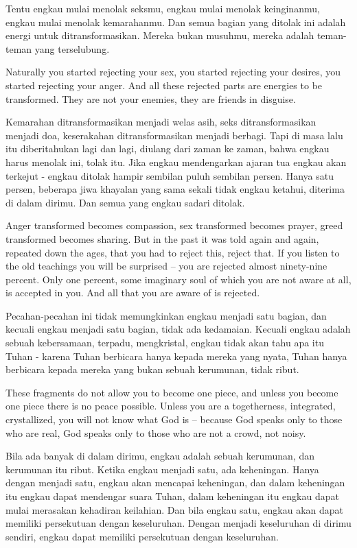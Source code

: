 \bahasa
Tentu engkau mulai menolak seksmu, engkau mulai menolak keinginanmu, engkau mulai menolak kemarahanmu. Dan semua bagian yang ditolak ini adalah energi untuk ditransformasikan. Mereka bukan musuhmu, mereka adalah teman-teman yang terselubung.

\english
Naturally you started rejecting your sex, you started rejecting your desires, you started rejecting your anger. And all these rejected parts are energies to be transformed. They are not your enemies, they are friends in disguise.

\bahasa
Kemarahan ditransformasikan menjadi welas asih, seks ditransformasikan menjadi doa, keserakahan ditransformasikan menjadi berbagi. Tapi di masa lalu itu diberitahukan lagi dan lagi, diulang dari zaman ke zaman, bahwa engkau harus menolak ini, tolak itu. Jika engkau mendengarkan ajaran tua engkau akan terkejut - engkau ditolak hampir sembilan puluh sembilan persen. Hanya satu persen, beberapa jiwa khayalan yang sama sekali tidak engkau ketahui, diterima di dalam dirimu. Dan semua yang engkau sadari ditolak.

\english
Anger transformed becomes compassion, sex transformed becomes prayer, greed transformed becomes sharing. But in the past it was told again and again, repeated down the ages, that you had to reject this, reject that. If you listen to the old teachings you will be surprised -- you are rejected almost ninety-nine percent. Only one percent, some imaginary soul of which you are not aware at all, is accepted in you. And all that you are aware of is rejected.

\bahasa
Pecahan-pecahan ini tidak memungkinkan engkau menjadi satu bagian, dan kecuali engkau menjadi satu bagian, tidak ada kedamaian. Kecuali engkau adalah sebuah kebersamaan, terpadu, mengkristal, engkau tidak akan tahu apa itu Tuhan - karena Tuhan berbicara hanya kepada mereka yang nyata, Tuhan hanya berbicara kepada mereka yang bukan sebuah kerumunan, tidak ribut.

\english
These fragments do not allow you to become one piece, and unless you become one piece there is no peace possible. Unless you are a togetherness, integrated, crystallized, you will not know what God is -- because God speaks only to those who are real, God speaks only to those who are not a crowd, not noisy.

\bahasa
Bila ada banyak di dalam dirimu, engkau adalah sebuah kerumunan, dan kerumunan itu ribut. Ketika engkau menjadi satu, ada keheningan. Hanya dengan menjadi satu, engkau akan mencapai keheningan, dan dalam keheningan itu engkau dapat mendengar suara Tuhan, dalam keheningan itu engkau dapat mulai merasakan kehadiran keilahian. Dan bila engkau satu, engkau akan dapat memiliki persekutuan dengan keseluruhan. Dengan menjadi keseluruhan di dirimu sendiri, engkau dapat memiliki persekutuan dengan keseluruhan.

